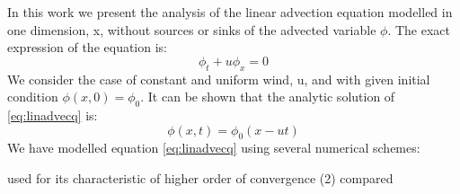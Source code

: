 
In this work we present the analysis of the linear advection equation modelled in one dimension, x, without sources or sinks of the advected variable $\phi$. The exact expression of the equation is:
\begin{equation} \label{eq:linadvec}
\phi_{t}+u\phi_{x}=0
\end{equation}
We consider the case of constant and uniform wind, u, and with given initial condition $\phi(x,0)=\phi_{0}$.
It can be shown that the analytic solution of \ref{eq:linadvecq} is:
\begin{equation} \label{eq:linadvec_initcondition}
\phi(x,t)=\phi_{0}(x-ut)
\end{equation}
We have modelled equation \ref{eq:linadvecq} using several numerical schemes:

used for its characteristic of higher order of convergence (2) compared\lessapprox
